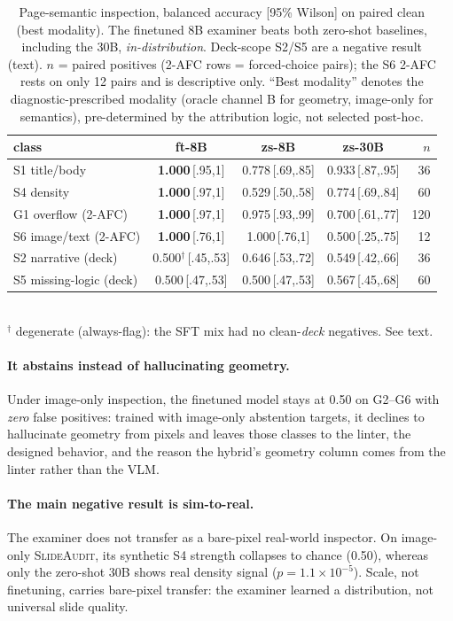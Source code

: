 \documentclass[10pt]{article}
\newcommand{\g}[1]{\textsf{#1}}        %
\newcommand{\best}[1]{\textbf{#1}}
\newcommand{\ci}[1]{\,{\scriptsize[#1]}}   %
\begin{document}
\begin{table}[t]
\centering\small
\caption{Page-semantic inspection, balanced accuracy [95\% Wilson] on paired clean (best modality). The
finetuned 8B examiner beats both zero-shot baselines, including the 30B, \emph{in-distribution}. Deck-scope
\g{S2}/\g{S5} are a negative result (text). $n$ = paired positives (2-AFC rows = forced-choice pairs);
the \g{S6} 2-AFC rests on only 12 pairs and is descriptive only. ``Best modality'' denotes the
diagnostic-prescribed modality (oracle channel B for geometry, image-only for semantics), pre-determined by the
attribution logic, not selected post-hoc.}
\label{tab:examiner}
\begin{tabular}{@{}lcccr@{}}
\toprule
class & \textbf{ft-8B} & zs-8B & zs-30B & $n$ \\
\midrule
\g{S1} title/body  & \best{1.000}\ci{.95,1} & 0.778\ci{.69,.85} & 0.933\ci{.87,.95} & 36 \\
\g{S4} density     & \best{1.000}\ci{.97,1} & 0.529\ci{.50,.58} & 0.774\ci{.69,.84} & 60 \\
\g{G1} overflow (2-AFC) & \best{1.000}\ci{.97,1} & 0.975\ci{.93,.99} & 0.700\ci{.61,.77} & 120 \\
\g{S6} image/text (2-AFC) & \best{1.000}\ci{.76,1} & 1.000\ci{.76,1} & 0.500\ci{.25,.75} & 12 \\
\midrule
\g{S2} narrative (deck) & 0.500$^\dagger$\ci{.45,.53} & 0.646\ci{.53,.72} & 0.549\ci{.42,.66} & 36 \\
\g{S5} missing-logic (deck) & 0.500\ci{.47,.53} & 0.500\ci{.47,.53} & 0.567\ci{.45,.68} & 60 \\
\bottomrule
\end{tabular}
\\[2pt]
{\footnotesize $^\dagger$ degenerate (always-flag): the SFT mix had no clean-\emph{deck} negatives. See text.}
\end{table}

\paragraph{It abstains instead of hallucinating geometry.}
Under image-only inspection, the finetuned model stays at 0.50 on \g{G2}--\g{G6} with \emph{zero} false
positives: trained with image-only abstention targets, it declines to hallucinate geometry from pixels and
leaves those classes to the linter, the designed behavior, and the reason the hybrid's geometry column comes
from the linter rather than the VLM.

\paragraph{The main negative result is sim-to-real.}
The examiner does not transfer as a bare-pixel real-world inspector. On image-only \textsc{SlideAudit}, its
synthetic \g{S4} strength collapses to chance (0.50), whereas only the zero-shot 30B shows real density signal
($p{=}1.1\!\times\!10^{-5}$). Scale, not finetuning, carries bare-pixel transfer: the examiner learned a
distribution, not universal slide quality.
\end{document}
